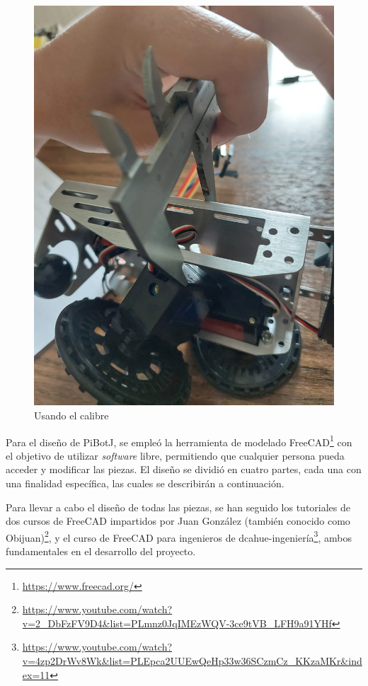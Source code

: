 \begin{figure}[ht!]
\begin{minipage}{0.4\linewidth}
		\includegraphics[width=\linewidth]{figs/cap5/calib2.jpeg}
		\caption*{\centering}
	\end{minipage}
	\caption{Usando el calibre}
	\label{fig:calibre}
\end{figure}

\setcounter{footnote}{64}

Para el diseño de PiBotJ, se empleó la herramienta de modelado FreeCAD\footnote{\url{https://www.freecad.org/}} con el objetivo de utilizar \textit{software} libre, permitiendo que cualquier persona pueda acceder y modificar las piezas. El diseño se dividió en cuatro partes, cada una con una finalidad específica, las cuales se describirán a continuación.

Para llevar a cabo el diseño de todas las piezas, se han seguido los tutoriales de dos cursos de FreeCAD impartidos por Juan González (también conocido como Obijuan)\footnote{\url{https://www.youtube.com/watch?v=2_DbFzFV9D4&list=PLmnz0JqIMEzWQV-3ce9tVB_LFH9a91YHf}}, y el curso de FreeCAD para ingenieros de dcahue-ingeniería\footnote{\url{https://www.youtube.com/watch?v=4zp2DrWv8Wk&list=PLEpca2UUEwQeHp33w36SCzmCz_KKzaMKr&index=11}}, ambos fundamentales en el desarrollo del proyecto.

